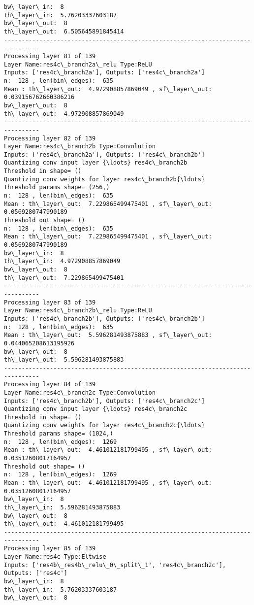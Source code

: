 \documentclass[11pt]{article}
\begin{document}
\begin{Verbatim}[commandchars=\\\{\}]
bw\_layer\_in:  8
th\_layer\_in:  5.76203337603187
bw\_layer\_out:  8
th\_layer\_out:  6.505645891845414
--------------------------------------------------------------------------------
Processing layer 81 of 139
Layer Name:res4c\_branch2a\_relu Type:ReLU
Inputs: ['res4c\_branch2a'], Outputs: ['res4c\_branch2a']
n:  128 , len(bin\_edges):  635
Mean : th\_layer\_out:  4.972908857869049 , sf\_layer\_out:  0.039156762660386216
bw\_layer\_out:  8
th\_layer\_out:  4.972908857869049
--------------------------------------------------------------------------------
Processing layer 82 of 139
Layer Name:res4c\_branch2b Type:Convolution
Inputs: ['res4c\_branch2a'], Outputs: ['res4c\_branch2b']
Quantizing conv input layer {\ldots} res4c\_branch2b
Threshold in shape= ()
Quantizing conv weights for layer res4c\_branch2b{\ldots}
Threshold params shape= (256,)
n:  128 , len(bin\_edges):  635
Mean : th\_layer\_out:  7.229865499475401 , sf\_layer\_out:  0.0569280747990189
Threshold out shape= ()
n:  128 , len(bin\_edges):  635
Mean : th\_layer\_out:  7.229865499475401 , sf\_layer\_out:  0.0569280747990189
bw\_layer\_in:  8
th\_layer\_in:  4.972908857869049
bw\_layer\_out:  8
th\_layer\_out:  7.229865499475401
--------------------------------------------------------------------------------
Processing layer 83 of 139
Layer Name:res4c\_branch2b\_relu Type:ReLU
Inputs: ['res4c\_branch2b'], Outputs: ['res4c\_branch2b']
n:  128 , len(bin\_edges):  635
Mean : th\_layer\_out:  5.596281493875883 , sf\_layer\_out:  0.044065208613195926
bw\_layer\_out:  8
th\_layer\_out:  5.596281493875883
--------------------------------------------------------------------------------
Processing layer 84 of 139
Layer Name:res4c\_branch2c Type:Convolution
Inputs: ['res4c\_branch2b'], Outputs: ['res4c\_branch2c']
Quantizing conv input layer {\ldots} res4c\_branch2c
Threshold in shape= ()
Quantizing conv weights for layer res4c\_branch2c{\ldots}
Threshold params shape= (1024,)
n:  128 , len(bin\_edges):  1269
Mean : th\_layer\_out:  4.461012181799495 , sf\_layer\_out:  0.03512608017164957
Threshold out shape= ()
n:  128 , len(bin\_edges):  1269
Mean : th\_layer\_out:  4.461012181799495 , sf\_layer\_out:  0.03512608017164957
bw\_layer\_in:  8
th\_layer\_in:  5.596281493875883
bw\_layer\_out:  8
th\_layer\_out:  4.461012181799495
--------------------------------------------------------------------------------
Processing layer 85 of 139
Layer Name:res4c Type:Eltwise
Inputs: ['res4b\_res4b\_relu\_0\_split\_1', 'res4c\_branch2c'], Outputs: ['res4c']
bw\_layer\_in:  8
th\_layer\_in:  5.76203337603187
bw\_layer\_out:  8

\end{Verbatim}
\end{document}
